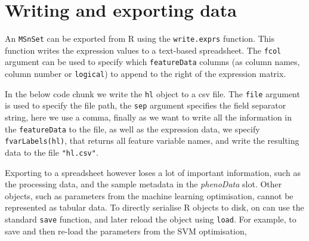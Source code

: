 \section*{Writing and exporting data}

An \texttt{MSnSet} can be exported from R using the
\texttt{write.exprs} function.  This function writes the expression
values to a text-based spreadsheet. The \texttt{fcol} argument can be
used to specify which \texttt{featureData} columns (as column names,
column number or \texttt{logical}) to append to the right of the
expression matrix.

In the below code chunk we write the \texttt{hl} object to a csv
file. The \texttt{file} argument is used to specify the file path, the
\texttt{sep} argument specifies the field separator string, here we
use a comma, finally as we want to write all the information in the
\texttt{featureData} to the file, as well as the expression data, we
specify \texttt{fvarLabels(hl)}, that returns all feature variable
names, and write the resulting data to the file \texttt{"hl.csv"}.

\begin{knitrout}
\color{fgcolor}\begin{kframe}
\begin{alltt}
  \hlstd{=} \hlstd{,}  \hlstd{=} \hlstd{,}  \hlstd{=} 
\end{alltt}
\end{kframe}
\end{knitrout}

Exporting to a spreadsheet however loses a lot of important
information, such as the processing data, and the sample metadata in
the \textit{phenoData} slot. Other objects, such as parameters from the
machine learning optimisation, cannot be represented as tabular
data. To directly serialise R objects to disk, on can use the standard
\texttt{save} function, and later reload the object using
\texttt{load}. For example, to save and then re-load the parameters
from the SVM optimisation,

\begin{knitrout}
\color{fgcolor}\begin{kframe}
\begin{alltt}
  \hlstd{=} \hlstd{)}

\hlstd{(} \hlstd{=} \hlstd{)}
\end{alltt}
\end{kframe}
\end{knitrout}

